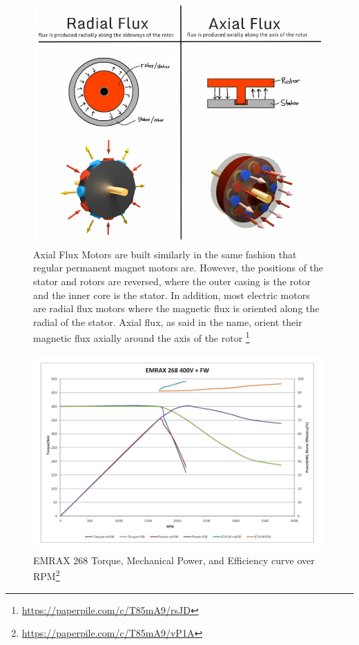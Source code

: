 \documentclass[main.tex]{subfiles}
\begin{document}
    \begin{figure}
        \centering
        \includegraphics[width=\textwidth]{images/fig6}
        \caption{Axial Flux Motors are built similarly in the same fashion that regular permanent magnet motors are. However, the positions of the stator and rotors are reversed, where the outer casing is the rotor and the inner core is the stator. In addition, most electric motors are radial flux motors where the magnetic flux is oriented along the radial of the stator. Axial flux, as said in the name, orient their magnetic flux axially around the axis of the rotor \protect\footnote{\url{https://paperpile.com/c/T85mA9/rsJD}}}
        \label{fig:axial-vs-radial}
    \end{figure}
    \begin{figure}
        \centering
        \includegraphics[width=\textwidth]{images/fig7}
        \caption{EMRAX 268 Torque, Mechanical Power, and Efficiency curve over RPM\protect\footnote{\url{https://paperpile.com/c/T85mA9/vP1A}}}
        \label{fig:emrax-efficiency}
    \end{figure}
\end{document}
